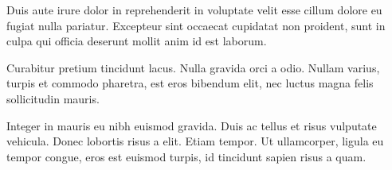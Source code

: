 Duis aute irure dolor in reprehenderit in voluptate velit esse cillum dolore eu fugiat nulla pariatur. Excepteur sint occaecat cupidatat non proident, sunt in culpa qui officia deserunt mollit anim id est laborum.

Curabitur pretium tincidunt lacus. Nulla gravida orci a odio. Nullam varius, turpis et commodo pharetra, est eros bibendum elit, nec luctus magna felis sollicitudin mauris.

Integer in mauris eu nibh euismod gravida. Duis ac tellus et risus vulputate vehicula. Donec lobortis risus a elit. Etiam tempor. Ut ullamcorper, ligula eu tempor congue, eros est euismod turpis, id tincidunt sapien risus a quam.
